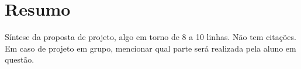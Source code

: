 \chapter[Resumo]{Resumo}

Síntese da proposta de projeto, algo em torno de 8 a 10 linhas. Não tem citações.   Em caso de projeto em grupo, mencionar qual parte será realizada pela aluno em questão.